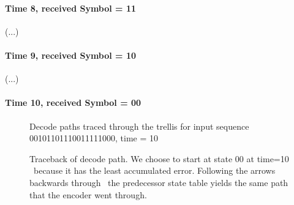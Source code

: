 \paragraph{Time 8, received Symbol = 11}
(...)
\paragraph{Time 9, received Symbol = 10}
(...)
\paragraph{Time 10, received Symbol = 00}
\begin{figure}
\center
\epsfxsize=5.5in
\caption{Decode paths traced through the trellis for input sequence 00101101110011111000, time = 10}
\label{fig:decode_time10}
\end{figure}





\begin{figure}
\center
\epsfxsize=5.5in
\caption{Traceback of decode path. We choose to start at state 00 at time=10 \
         because it has the least accumulated error. Following the arrows backwards through \
	 the predecessor state table yields the same path that the encoder went through.}
\label{fig:decode_traceback}
\end{figure}



